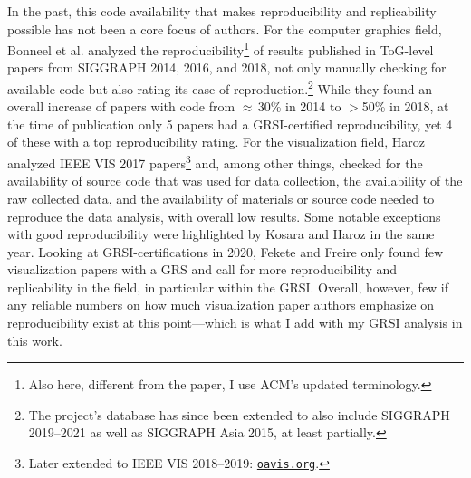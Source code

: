 \documentclass[conference]{vgtc}                     %
\begin{document}
In the past, this code availability that makes reproducibility and replicability possible has not been a core focus of authors. For the computer graphics field, Bonneel et al. \cite{Bonneel:2020:CRC} analyzed the reproducibility\footnote{Also here, different from the paper, I use ACM's updated terminology.} of results published in ToG-level papers from SIGGRAPH 2014, 2016, and 2018, not only manually checking for available code but also rating its ease of reproduction.\footnote{The project's database has since been extended to also include SIGGRAPH 2019--2021 as well as SIGGRAPH Asia 2015, at least partially.} While they found an overall increase of papers with code from $\approx$\,30\% in 2014 to $>$50\% in 2018, at the time of publication only 5 papers had a GRSI-certified reproducibility, yet 4 of these with a top reproducibility rating. For the visualization field, Haroz \cite{Haroz:2018:OPV} analyzed IEEE VIS 2017 papers\footnote{Later extended to IEEE VIS 2018--2019: \href{http://oavis.org/}{\texttt{oavis.org}}.} and, among other things, checked for the availability of source code that was used for data collection, the availability of the raw collected data, and the availability of materials or source code needed to reproduce the data analysis, with overall low results. Some notable exceptions with good reproducibility were highlighted by Kosara and Haroz \cite{Kosara:2018:SRC} in the same year. Looking at GRSI-certifications in 2020, Fekete and Freire \cite{Fekete:2020:ERV} only found few visualization papers with a GRS and call for more reproducibility and replicability in the field, in particular within the GRSI. Overall, however, few if any reliable numbers on how much visualization paper authors emphasize on reproducibility exist at this point---which is what I add with my GRSI analysis in this work.
\end{document}
